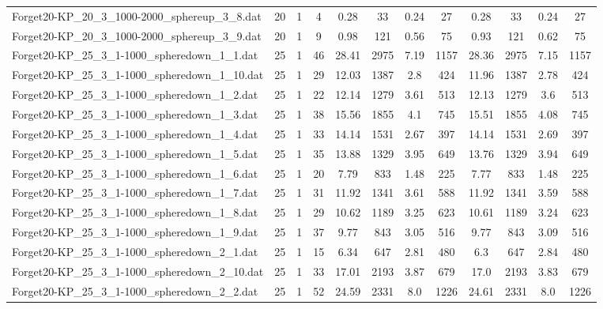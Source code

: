 \begin{sidewaystable}[!ht]
{\begin{tabular}{lccccccccccc}
Forget20-KP\_20\_3\_1000-2000\_sphereup\_3\_8.dat & 20 & 1 & 4 & 0.28 & 33 &  \textcolor{blue2}{0.24} & 27 & 0.28 & 33 &  \textcolor{blue2}{0.24} & 27 \\
Forget20-KP\_20\_3\_1000-2000\_sphereup\_3\_9.dat & 20 & 1 & 9 & 0.98 & 121 &  \textcolor{blue2}{0.56} & 75 & 0.93 & 121 & 0.62 & 75 \\
Forget20-KP\_25\_3\_1-1000\_spheredown\_1\_1.dat & 25 & 1 & 46 & 28.41 & 2975 & 7.19 & 1157 & 28.36 & 2975 &  \textcolor{blue2}{7.15} & 1157 \\
Forget20-KP\_25\_3\_1-1000\_spheredown\_1\_10.dat & 25 & 1 & 29 & 12.03 & 1387 & 2.8 & 424 & 11.96 & 1387 &  \textcolor{blue2}{2.78} & 424 \\
Forget20-KP\_25\_3\_1-1000\_spheredown\_1\_2.dat & 25 & 1 & 22 & 12.14 & 1279 & 3.61 & 513 & 12.13 & 1279 &  \textcolor{blue2}{3.6} & 513 \\
Forget20-KP\_25\_3\_1-1000\_spheredown\_1\_3.dat & 25 & 1 & 38 & 15.56 & 1855 & 4.1 & 745 & 15.51 & 1855 &  \textcolor{blue2}{4.08} & 745 \\
Forget20-KP\_25\_3\_1-1000\_spheredown\_1\_4.dat & 25 & 1 & 33 & 14.14 & 1531 &  \textcolor{blue2}{2.67} & 397 & 14.14 & 1531 & 2.69 & 397 \\
Forget20-KP\_25\_3\_1-1000\_spheredown\_1\_5.dat & 25 & 1 & 35 & 13.88 & 1329 & 3.95 & 649 & 13.76 & 1329 &  \textcolor{blue2}{3.94} & 649 \\
Forget20-KP\_25\_3\_1-1000\_spheredown\_1\_6.dat & 25 & 1 & 20 & 7.79 & 833 & 1.48 & 225 & 7.77 & 833 & 1.48 & 225 \\
Forget20-KP\_25\_3\_1-1000\_spheredown\_1\_7.dat & 25 & 1 & 31 & 11.92 & 1341 & 3.61 & 588 & 11.92 & 1341 &  \textcolor{blue2}{3.59} & 588 \\
Forget20-KP\_25\_3\_1-1000\_spheredown\_1\_8.dat & 25 & 1 & 29 & 10.62 & 1189 & 3.25 & 623 & 10.61 & 1189 &  \textcolor{blue2}{3.24} & 623 \\
Forget20-KP\_25\_3\_1-1000\_spheredown\_1\_9.dat & 25 & 1 & 37 & 9.77 & 843 &  \textcolor{blue2}{3.05} & 516 & 9.77 & 843 & 3.09 & 516 \\
Forget20-KP\_25\_3\_1-1000\_spheredown\_2\_1.dat & 25 & 1 & 15 & 6.34 & 647 &  \textcolor{blue2}{2.81} & 480 & 6.3 & 647 & 2.84 & 480 \\
Forget20-KP\_25\_3\_1-1000\_spheredown\_2\_10.dat & 25 & 1 & 33 & 17.01 & 2193 & 3.87 & 679 & 17.0 & 2193 &  \textcolor{blue2}{3.83} & 679 \\
Forget20-KP\_25\_3\_1-1000\_spheredown\_2\_2.dat & 25 & 1 & 52 & 24.59 & 2331 &  \textcolor{blue2}{8.0} & 1226 & 24.61 & 2331 &  \textcolor{blue2}{8.0} & 1226 \\

\end{tabular}}
\end{sidewaystable}
